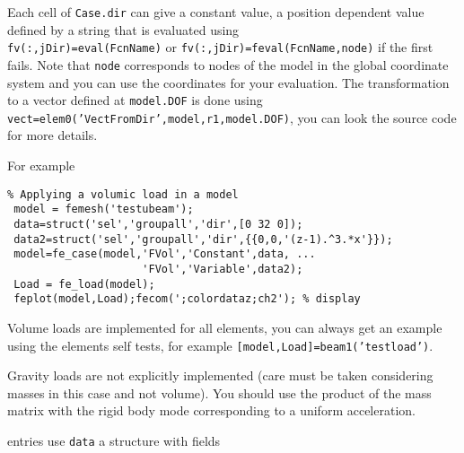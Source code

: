 Each cell of {\tt Case.dir} can give a constant value, a position dependent value defined by a string  that is evaluated using \\{\tt fv(:,jDir)=eval(FcnName)} or {\tt fv(:,jDir)=feval(FcnName,node)} if the first fails. Note that {\tt node} corresponds to nodes of the model in the global coordinate system and you can use the coordinates  for your evaluation. The transformation to a vector defined at {\tt model.DOF} is done using {\tt vect=elem0('VectFromDir',model,r1,model.DOF)}, you can look the source code for more details.

For example 

\begin{verbatim}
% Applying a volumic load in a model
 model = femesh('testubeam');
 data=struct('sel','groupall','dir',[0 32 0]);
 data2=struct('sel','groupall','dir',{{0,0,'(z-1).^3.*x'}});
 model=fe_case(model,'FVol','Constant',data, ...
                     'FVol','Variable',data2);
 Load = fe_load(model); 
 feplot(model,Load);fecom(';colordataz;ch2'); % display
\end{verbatim}%


Volume loads are implemented for all elements, you can always get an example using the elements self tests, for example {\tt [model,Load]=beam1('testload')}.

Gravity loads are not explicitly implemented (care must be taken considering masses in this case and not volume). You should use the product of the mass matrix with the rigid body mode corresponding to a uniform acceleration.

\newpage
{} %


 entries use {\tt data} a structure with fields


